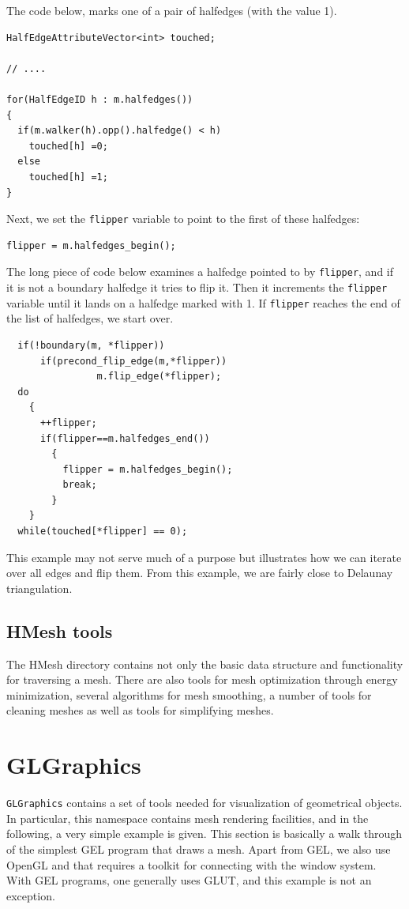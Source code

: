 \documentclass[a4paper]{article}
\begin{document}
The code below, marks one of a pair of halfedges (with the value 1).
\begin{verbatim}
HalfEdgeAttributeVector<int> touched;

// ....

for(HalfEdgeID h : m.halfedges())
{
  if(m.walker(h).opp().halfedge() < h)
    touched[h] =0;
  else
    touched[h] =1;
}
\end{verbatim}
Next, we set the \texttt{flipper} variable to point to the first of these halfedges:
\begin{verbatim}
flipper = m.halfedges_begin();
\end{verbatim}
The long piece of code below examines a halfedge pointed to by \texttt{flipper}, and if it is not a boundary halfedge it tries to flip it. Then it increments the \texttt{flipper} variable until it lands on a halfedge marked with 1. If \texttt{flipper} reaches the end of the list of halfedges, we start over.
\begin{verbatim}
  if(!boundary(m, *flipper)) 
      if(precond_flip_edge(m,*flipper))
                m.flip_edge(*flipper);
  do
    {
      ++flipper;
      if(flipper==m.halfedges_end())
        {
          flipper = m.halfedges_begin();
          break;
        }
    }
  while(touched[*flipper] == 0);
\end{verbatim}
This example may not serve much of a purpose but illustrates how we can iterate over all edges and flip them. From this example, we are fairly close to Delaunay triangulation.

\subsection{HMesh tools}

The HMesh directory contains not only the basic data structure and functionality for traversing a mesh. There are also tools for mesh optimization through energy minimization, several algorithms for mesh smoothing, a number of tools for cleaning meshes as well as tools for simplifying meshes.
%
%
\section{GLGraphics}
%
%
\texttt{GLGraphics} contains a set of tools needed for visualization of geometrical objects. In particular, this namespace contains mesh rendering facilities, and in the following, a very simple example is given. This section is basically a walk through of the simplest GEL program that draws a mesh. Apart from GEL, we also use OpenGL and that requires a toolkit for connecting with the window system. With GEL programs, one generally uses GLUT, and this example is not an exception.
\end{document}
